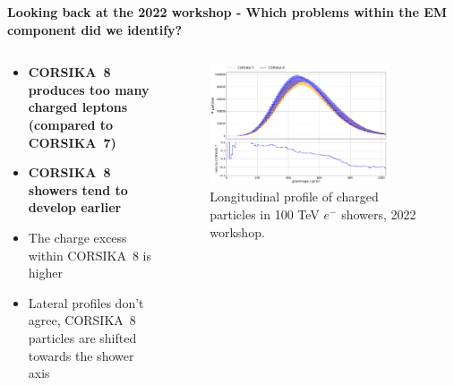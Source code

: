 \documentclass[aspectratio=1610, 9pt]{beamer}
\begin{document}
\begin{frame}

\textbf{Looking back at the 2022 workshop - Which problems within the EM component did we identify?}

    \begin{columns}[onlytextwidth]
        \begin{column}{0.5\textwidth}
            \begin{itemize}
              \item \textbf{CORSIKA~8 produces too many charged leptons (compared to CORSIKA~7)}
              \item \textbf{CORSIKA~8 showers tend to develop earlier}
              \item The charge excess within CORSIKA~8 is higher
              \item Lateral profiles don't agree, CORSIKA~8 particles are shifted towards the shower axis
            \end{itemize}
        \end{column}
        \begin{column}{0.5\textwidth}
            \begin{figure}
                \centering
                \includegraphics[width=0.85\textwidth]{plots/long_charged_2022.png}
                \caption{Longitudinal profile of charged particles in 100 \si{\tera\electronvolt} $e^-$ showers, 2022 workshop.}
            \end{figure}
        \end{column}
    \end{columns}
\end{frame}
\end{document}

